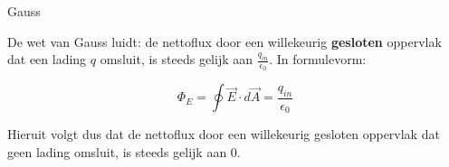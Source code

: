 \begin{lem}[Gauss]{Gauss}

    De wet van Gauss luidt: de nettoflux door een willekeurig \textbf{gesloten} oppervlak dat een lading $ q $ omsluit, is steeds gelijk aan $ \tfrac{q_{in}}{\epsilon_0} $. In formulevorm:
    
    \begin{equation*}
        \Phi_E = \oint \Vec{E}\cdot d\Vec{A} = \dfrac{q_{in}}{\epsilon_0}
    \end{equation*}
    
    \noindent Hieruit volgt dus dat de nettoflux door een willekeurig gesloten oppervlak dat geen lading omsluit, is steeds gelijk aan 0. 
\end{lem}






